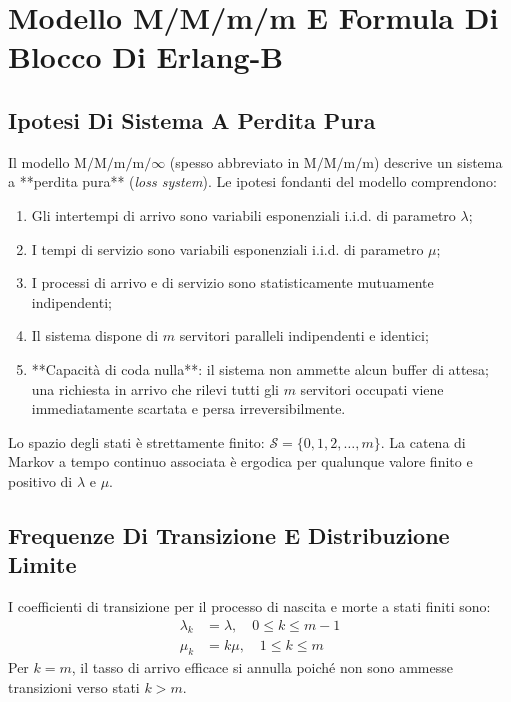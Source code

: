 \documentclass[11pt, a4paper]{article}
\begin{document}

\section{Modello M/M/m/m E Formula Di Blocco Di Erlang-B}

\subsection{Ipotesi Di Sistema A Perdita Pura}

Il modello $\mathrm{M/M/m/m/\infty}$ (spesso abbreviato in $\mathrm{M/M/m/m}$) descrive un sistema a **perdita pura** (\emph{loss system}). Le ipotesi fondanti del modello comprendono:
\begin{enumerate}[noitemsep]
    \item Gli intertempi di arrivo sono variabili esponenziali i.i.d. di parametro $\lambda$;
    \item I tempi di servizio sono variabili esponenziali i.i.d. di parametro $\mu$;
    \item I processi di arrivo e di servizio sono statisticamente mutuamente indipendenti;
    \item Il sistema dispone di $m$ servitori paralleli indipendenti e identici;
    \item **Capacità di coda nulla**: il sistema non ammette alcun buffer di attesa; una richiesta in arrivo che rilevi tutti gli $m$ servitori occupati viene immediatamente scartata e persa irreversibilmente.
\end{enumerate}
Lo spazio degli stati è strettamente finito: $\mathcal{S} = \{0, 1, 2, \dots, m\}$. La catena di Markov a tempo continuo associata è ergodica per qualunque valore finito e positivo di $\lambda$ e $\mu$.

\subsection{Frequenze Di Transizione E Distribuzione Limite}

I coefficienti di transizione per il processo di nascita e morte a stati finiti sono:
\begin{align*}
\lambda_k &= \lambda, \quad 0 \le k \le m-1 \\
\mu_k &= k\mu, \quad 1 \le k \le m
\end{align*}
Per $k = m$, il tasso di arrivo efficace si annulla poiché non sono ammesse transizioni verso stati $k > m$.
\end{document}
